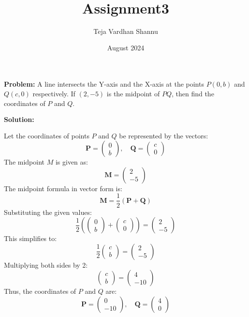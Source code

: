 \documentclass[journal]{IEEEtran}
\title{Assignment3}
\author{Teja Vardhan Shannu}
\date{August 2024}
\numberwithin{equation}{enumi}
\numberwithin{figure}{enumi}
\begin{document}
\maketitle
\textbf{Problem:} A line intersects the Y-axis and the X-axis at the points $P(0,b)$ and $Q(c,0)$ respectively. If $(2,-5)$ is the midpoint of $PQ$, then find the coordinates of $P$ and $Q$.

\textbf{Solution:}

Let the coordinates of points $P$ and $Q$ be represented by the vectors:
\[
\mathbf{P} = \begin{pmatrix} 0 \\ b \end{pmatrix}, \quad \mathbf{Q} = \begin{pmatrix} c \\ 0 \end{pmatrix}
\]
The midpoint $M$ is given as:
\[
\mathbf{M} = \begin{pmatrix} 2 \\ -5 \end{pmatrix}
\]
The midpoint formula in vector form is:
\[
\mathbf{M} = \frac{1}{2} (\mathbf{P} + \mathbf{Q})
\]
Substituting the given values:
\[
\frac{1}{2} \left(\begin{pmatrix} 0 \\ b \end{pmatrix} + \begin{pmatrix} c \\ 0 \end{pmatrix}\right) = \begin{pmatrix} 2 \\ -5 \end{pmatrix}
\]
This simplifies to:
\[
\frac{1}{2} \begin{pmatrix} c \\ b \end{pmatrix} = \begin{pmatrix} 2 \\ -5 \end{pmatrix}
\]
Multiplying both sides by 2:
\[
\begin{pmatrix} c \\ b \end{pmatrix} = \begin{pmatrix} 4 \\ -10 \end{pmatrix}
\]
Thus, the coordinates of $P$ and $Q$ are:
\[
\mathbf{P} = \begin{pmatrix} 0 \\ -10 \end{pmatrix}, \quad \mathbf{Q} = \begin{pmatrix} 4 \\ 0 \end{pmatrix}
\]
\end{document}
